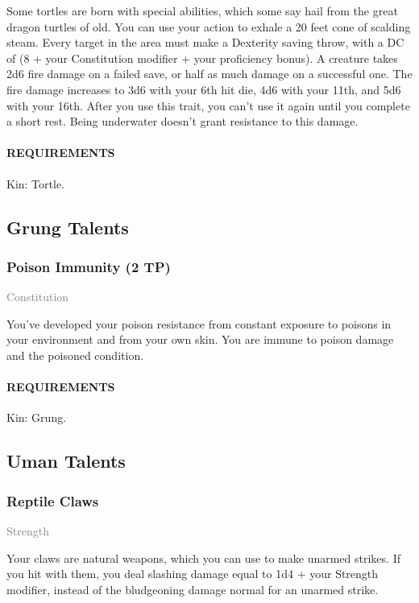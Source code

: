     \normalsize
    Some tortles are born with special abilities, which some say hail from the great dragon turtles of old.
    You can use your action to exhale a 20 feet cone of scalding steam.
    Every target in the area must make a Dexterity saving throw, with a DC of (8 + your Constitution modifier + your proficiency bonus).
    A creature takes 2d6 fire damage on a failed save, or half as much damage on a successful one.
    The fire damage increases to 3d6 with your 6th hit die, 4d6 with your 11th, and 5d6 with your 16th.
    After you use this trait, you can't use it again until you complete a short rest.
    Being underwater doesn't grant resistance to this damage.

    \paragraph{REQUIREMENTS} Kin: Tortle.

\subsection*{Grung Talents}
    \subsubsection{Poison Immunity (2 TP)} \label{tal::poisonimmunity}
    \small{\textcolor{gray}{Constitution}}

    \normalsize
    You've developed your poison resistance from constant exposure to poisons in your environment and from your own skin.
    You are immune to poison damage and the poisoned condition.
    \paragraph{REQUIREMENTS} Kin: Grung.

\subsection*{Uman Talents}
    \subsubsection{Reptile Claws} \label{tal::reptileclaws}
    \small{\textcolor{gray}{Strength}}

    \normalsize
    Your claws are natural weapons, which you can use to make unarmed strikes.
    If you hit with them, you deal slashing damage equal to 1d4 + your Strength modifier, instead of the bludgeoning damage normal for an unarmed strike.
